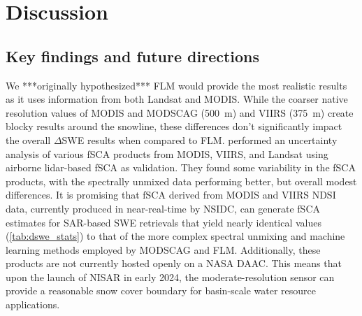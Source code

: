 \hypertarget{ch5-discussion}{\section{Discussion}\label{ch4-discussion}}
\hypertarget{ch5-discussion-1}{\subsection{Key findings and future directions}\label{ch4-discussion}}

We ***originally hypothesized*** FLM would provide the most realistic results as it uses information from both Landsat and MODIS. While the coarser native resolution values of MODIS and MODSCAG (500~m) and VIIRS (375~m) create blocky results around the snowline, these differences don't significantly impact the overall $\Delta$SWE results when compared to FLM. \cite{stillingerLandsatMODISVIIRS2023a} performed an uncertainty analysis of various fSCA products from MODIS, VIIRS, and Landsat using airborne lidar-based fSCA as validation. They found some variability in the fSCA products, with the spectrally unmixed data performing better, but overall modest differences. It is promising that fSCA derived from MODIS and VIIRS NDSI data, currently produced in near-real-time by NSIDC, can generate fSCA estimates for SAR-based SWE retrievals that yield nearly identical values (\ref{tab:dswe_stats}) to that of the more complex spectral unmixing and machine learning methods employed by MODSCAG and FLM. Additionally, these products are not currently hosted openly on a NASA DAAC. This means that upon the launch of NISAR in early 2024, the moderate-resolution sensor can provide a reasonable snow cover boundary for basin-scale water resource applications. 

